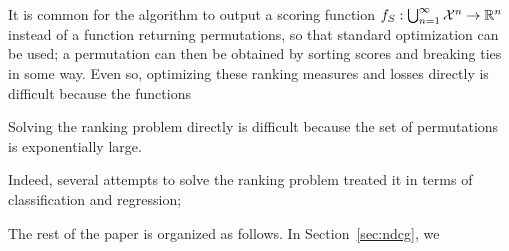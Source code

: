 It is common for the algorithm to output a scoring function 
$f_S: \bigcup_{n=1}^\infty {\mathcal X}^n \to \mathbb{R}^n$ instead of a function returning
permutations, so that standard optimization can be used; a permutation can
then be obtained by sorting scores and breaking ties in some way.
Even so, optimizing these ranking measures and losses directly is difficult
because the functions 

Solving the ranking problem directly is difficult because the set of
permutations is exponentially large. 

Indeed, several attempts to solve the ranking problem treated
it in terms of classification and regression; 

The rest of the paper is organized as follows. In Section~\ref{sec:ndcg},
we 
